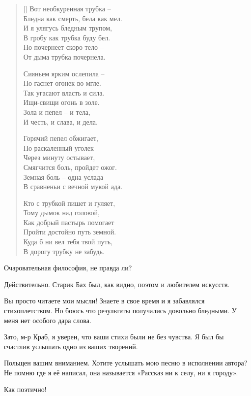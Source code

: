 \documentclass[../main.tex]{subfiles}
\begin{document}
\begin{dialogue}
\begin{verse}[\versewidth]
Вот необкуренная трубка \--- \\
Бледна как смерть, бела как мел. \\
И я улягусь бледным трупом, \\
В гробу как трубка буду бел. \\
Но почернеет скоро тело \--- \\
От дыма трубка почернела.

Сияньем ярким ослепила \--- \\
Но гаснет огонек во мгле. \\
Так угасают власть и сила. \\
Ищи-свищи огонь в золе. \\
Зола и пепел \--- и тела, \\
И честь, и слава, и дела.

Горячий пепел обжигает, \\
Но раскаленный уголек \\
Через минуту остывает, \\
Смягчится боль, пройдет ожог. \\
Земная боль \--- одна услада \\
В сравненьи с вечной мукой ада.

Кто с трубкой пишет и гуляет, \\
Тому дымок над головой, \\
Как добрый пастырь помогает \\
Пройти достойно путь земной. \\
Куда б ни вел тебя твой путь, \\
В дорогу трубку не забудь.
\end{verse}
\endgroup

Очаровательная философия, не правда ли?

 Действительно. Старик Бах был, как видно, поэтом и любителем искусств.

 Вы просто читаете мои мысли! Знаете в свое время и я забавлялся стихоплетством. Но боюсь что результаты получались довольно бледными. У меня нет особого дара слова.

 Зато, м-р Краб, я уверен, что ваши стихи были не без чувства. Я был бы счастлив услышать одно из ваших творений.

 Польщен вашим вниманием. Хотите услышать мою песню в исполнении автора? Не помню где я её написал, она называется «Рассказ ни к селу, ни к городу».

 Как поэтично!


\end{dialogue}
\end{document}
